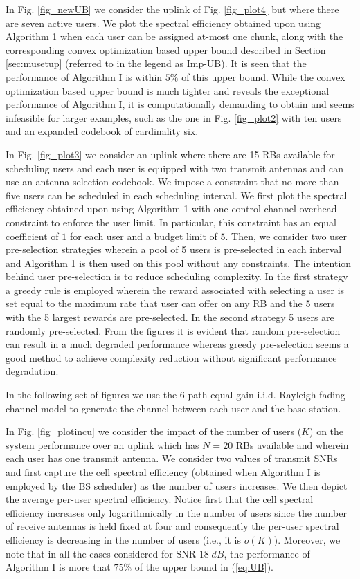 \documentclass[11pt] {article}
\begin{document}
In Fig. \ref{fig_newUB} we consider the uplink of Fig. \ref{fig_plot4} but where there are seven active users.  We   plot the spectral efficiency obtained upon using Algorithm 1 when each user can be assigned at-most one chunk, along with the corresponding convex optimization based upper bound described in Section \ref{sec:musetup} (referred to in the legend as Imp-UB). It is seen that the performance of Algorithm I is within $5\%$ of this upper bound. While the convex optimization based upper bound is much tighter and reveals the  exceptional performance of Algorithm I, it is computationally demanding to obtain and seems infeasible for larger examples, such as the one in Fig. \ref{fig_plot2} with ten users  and an expanded codebook of  cardinality six.


 In Fig. \ref{fig_plot3} we consider an uplink where there are 15 RBs available for scheduling users and each user is equipped with two transmit antennas and can use an antenna  selection codebook. We impose  a constraint that no more than five users can be scheduled in each scheduling interval. We first plot the spectral efficiency obtained upon using Algorithm 1 with   one control channel overhead constraint to enforce the user limit. In particular, this  constraint has an equal coefficient of $1$ for each user and a budget limit of $5$. Then, we consider two user pre-selection strategies wherein a pool of 5 users is pre-selected in each interval and Algorithm 1 is then used on this pool without any constraints. The intention behind user pre-selection is to reduce scheduling complexity. In the first strategy a greedy rule is employed wherein the reward associated with selecting a user is set equal to the maximum rate that user can offer on any RB and the 5 users with the 5 largest rewards are pre-selected. In the second strategy 5 users are randomly pre-selected. From the figures it is evident that random pre-selection can result in a much degraded performance whereas greedy pre-selection seems a good method to achieve complexity reduction without significant performance degradation.

In the following set of figures we use the 6 path equal gain i.i.d. Rayleigh fading channel model to generate the channel between each user and the base-station.

In Fig. \ref{fig_plotincu} we consider the impact of the number of users ($K$) on the system performance
over an uplink which has  $N=20$ RBs available and wherein each user has one transmit antenna.  We consider two values of  transmit SNRs and first capture the cell spectral efficiency (obtained when Algorithm I is employed by the BS scheduler) as the number of users increases. We then depict the average per-user spectral efficiency.
  Notice first  that the cell spectral efficiency increases only  logarithmically in the number of users since the number of receive antennas is held fixed at four and consequently the per-user spectral efficiency is decreasing in the number of users (i.e., it is $o(K)$). Moreover, we note that in all the cases considered for SNR $18\;dB$, the performance of Algorithm I is more that $75\%$ of the upper bound in (\ref{eq:UB}).
\end{document}
